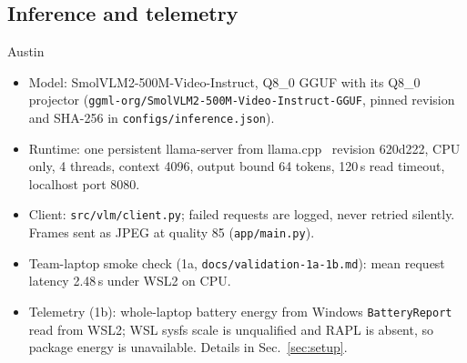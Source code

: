 \subsection{Inference and telemetry}
\label{sec:inference}
\begin{notes}{Austin}
\begin{itemize}\setlength\itemsep{0pt}
\item Model: SmolVLM2-500M-Video-Instruct, Q8\_0 GGUF with its Q8\_0 projector (\texttt{ggml-org/SmolVLM2-500M-Video-Instruct-GGUF}, pinned revision and SHA-256 in \texttt{configs/inference.json}).
\item Runtime: one persistent llama-server from llama.cpp~\cite{llamacpp} revision 620d222, CPU only, 4 threads, context 4096, output bound 64 tokens, 120\,s read timeout, localhost port 8080.
\item Client: \texttt{src/vlm/client.py}; failed requests are logged, never retried silently. Frames sent as JPEG at quality 85 (\texttt{app/main.py}).
\item Team-laptop smoke check (1a, \texttt{docs/validation-1a-1b.md}): mean request latency 2.48\,s under WSL2 on CPU.
\item Telemetry (1b): whole-laptop battery energy from Windows \texttt{BatteryReport} read from WSL2; WSL sysfs scale is unqualified and RAPL is absent, so package energy is unavailable. Details in Sec.~\ref{sec:setup}.
\end{itemize}
\end{notes}
